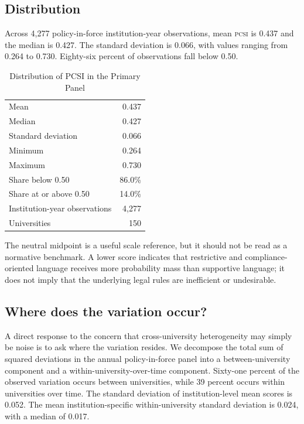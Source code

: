 \documentclass[12pt]{article}
\newcommand{\PCSI}{\textsc{pcsi}}
\begin{document}
\subsection{Distribution}

Across 4,277 policy-in-force institution-year observations, mean \PCSI{} is 0.437 and the median is 0.427. The standard deviation is 0.066, with values ranging from 0.264 to 0.730. Eighty-six percent of observations fall below 0.50.

\begin{table}[H]
\centering
\caption{Distribution of PCSI in the Primary Panel}
\label{tab:distribution}
\small
\begin{tabular}{lr}
\toprule
Mean & 0.437\\
Median & 0.427\\
Standard deviation & 0.066\\
Minimum & 0.264\\
Maximum & 0.730\\
Share below 0.50 & 86.0\%\\
Share at or above 0.50 & 14.0\%\\
Institution-year observations & 4,277\\
Universities & 150\\
\bottomrule
\end{tabular}
\end{table}

The neutral midpoint is a useful scale reference, but it should not be read as a normative benchmark. A lower score indicates that restrictive and compliance-oriented language receives more probability mass than supportive language; it does not imply that the underlying legal rules are inefficient or undesirable.

\subsection{Where does the variation occur?}

A direct response to the concern that cross-university heterogeneity may simply be noise is to ask where the variation resides. We decompose the total sum of squared deviations in the annual policy-in-force panel into a between-university component and a within-university-over-time component. Sixty-one percent of the observed variation occurs between universities, while 39 percent occurs within universities over time. The standard deviation of institution-level mean scores is 0.052. The mean institution-specific within-university standard deviation is 0.024, with a median of 0.017.
\end{document}
